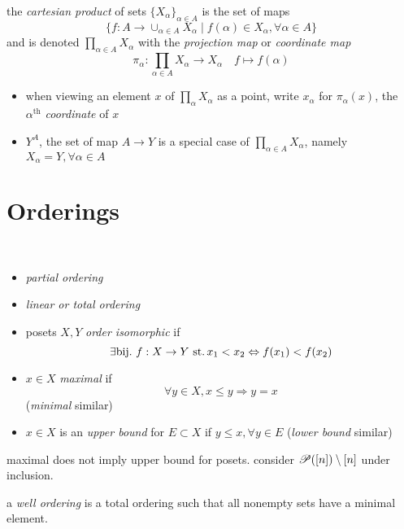 \begin{defn}
  the \emph{cartesian product} of sets $\{X_\alpha\}_{\alpha \in A}$ is the set of maps
  \[ \{ f: A \rightarrow \cup_{\alpha\in A} X_\alpha \mid f(\alpha)\in X_\alpha , \forall \alpha \in A \} \]
  and is denoted $\prod_{\alpha\in A} X_\alpha$ with the \emph{projection map} or \emph{coordinate map}
  \[ \pi_\alpha : \prod_{\alpha\in A} X_\alpha \rightarrow X_\alpha \quad f \mapsto f(\alpha) \]
  \begin{itemize}
  \item when viewing an element $x$ of $\prod_\alpha X_\alpha$ as a point,
    write $x_\alpha$ for $\pi_\alpha(x)$,
    the $\alpha^{\text{th}}$ \emph{coordinate} of $x$
  \item $Y^A$, the set of map ${A \rightarrow Y}$ is a special case of
    ${\prod_{\alpha\in A} X_\alpha}$, namely
    ${X_\alpha = Y, \forall \alpha\in A}$
  \end{itemize}
\end{defn}


\section{Orderings}

\begin{defn}\
  \begin{itemize}
  \item \emph{partial ordering}
  \item \emph{linear or total ordering}
  \item posets $X, Y$ \emph{order isomorphic} if
    \[ \exists\text{bij.~}f: X \rightarrow Y \operatorname{\,st.}
    x_1 < x_2 \Leftrightarrow f(x_1) < f(x_2) \]
  \item ${x \in X}$ \emph{maximal} if
    \[ \forall y\in X, x\leq y \Rightarrow y=x \]
    (\emph{minimal} similar)
  \item ${x\in X}$ is an \emph{upper bound} for ${E\subset X}$
    if $y\leq x, \forall y\in E$ (\emph{lower bound} similar)
  \end{itemize}
\end{defn}

\begin{rem}{}
  maximal does not imply upper bound for posets.
  consider ${\mathscr{P}(\small{[n]})\setminus [n]}$ under inclusion.
\end{rem}

\begin{defn}
  a \emph{well ordering} is a total ordering such that
  all nonempty sets have a minimal element.
\end{defn}

